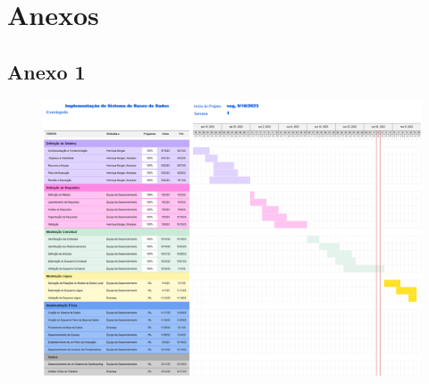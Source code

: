 \documentclass[a4paper,12pt]{scrreprt}
\begin{document}



\chapter{Anexos}
    
    \section{Anexo 1} \label{GANTT}
        \begin{figure}[h]
            \centering
            \includegraphics[width=6.2in]{images/GANTT.png}
        \end{figure}
\newpage
\end{document}
